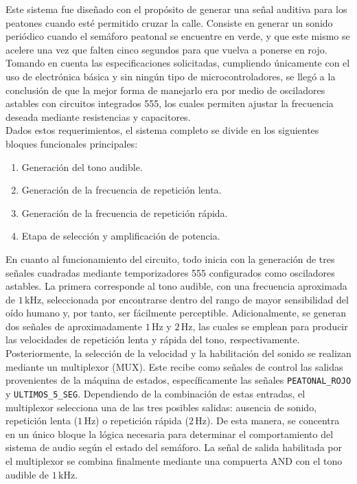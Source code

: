 \documentclass[12pt, journal, onecolumn]{IEEEtran}
\begin{document}
Este sistema fue diseñado con el propósito de generar una señal auditiva para los peatones cuando esté permitido cruzar la calle. Consiste en generar un sonido periódico cuando el semáforo peatonal se encuentre en verde, y que este mismo se acelere una vez que falten cinco segundos para que vuelva a ponerse en rojo.\\

Tomando en cuenta las especificaciones solicitadas, cumpliendo únicamente con el uso de electrónica básica y sin ningún tipo de microcontroladores, se llegó a la conclusión de que la mejor forma de manejarlo era por medio de osciladores astables con circuitos integrados 555, los cuales permiten ajustar la frecuencia deseada mediante resistencias y capacitores.\\

Dados estos requerimientos, el sistema completo se divide en los siguientes bloques funcionales principales:

\begin{enumerate}
    \item Generación del tono audible.
    \item Generación de la frecuencia de repetición lenta.
    \item Generación de la frecuencia de repetición rápida.
    \item Etapa de selección y amplificación de potencia.
\end{enumerate}

En cuanto al funcionamiento del circuito, todo inicia con la generación de tres señales cuadradas mediante temporizadores 555 configurados como osciladores astables. La primera corresponde al tono audible, con una frecuencia aproximada de $1\,\mathrm{kHz}$, seleccionada por encontrarse dentro del rango de mayor sensibilidad del oído humano y, por tanto, ser fácilmente perceptible. Adicionalmente, se generan dos señales de aproximadamente $1\,\mathrm{Hz}$ y $2\,\mathrm{Hz}$, las cuales se emplean para producir las velocidades de repetición lenta y rápida del tono, respectivamente.\\

Posteriormente, la selección de la velocidad y la habilitación del sonido se realizan mediante un multiplexor (MUX). Este recibe como señales de control las salidas provenientes de la máquina de estados, específicamente las señales \texttt{PEATONAL\_ROJO} y \texttt{ULTIMOS\_5\_SEG}. Dependiendo de la combinación de estas entradas, el multiplexor selecciona una de las tres posibles salidas: ausencia de sonido, repetición lenta ($1\,\mathrm{Hz}$) o repetición rápida ($2\,\mathrm{Hz}$). De esta manera, se concentra en un único bloque la lógica necesaria para determinar el comportamiento del sistema de audio según el estado del semáforo. La señal de salida habilitada por el multiplexor se combina finalmente mediante una compuerta AND con el tono audible de $1\,\mathrm{kHz}$.\\
\end{document}
